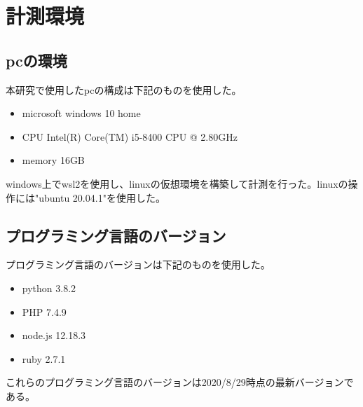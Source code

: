 \chapter{計測環境}
\label{cha:environment}
\section{pcの環境}
本研究で使用したpcの構成は下記のものを使用した。
\begin{itemize}
  \item microsoft windows 10 home
  \item CPU Intel(R) Core(TM) i5-8400 CPU @ 2.80GHz
  \item memory 16GB
\end{itemize}

windows上でwsl2を使用し、linuxの仮想環境を構築して計測を行った。linuxの操作には"ubuntu 20.04.1"を使用した。

\section{プログラミング言語のバージョン}
プログラミング言語のバージョンは下記のものを使用した。
\begin{itemize}
  \item python 3.8.2
  \item PHP 7.4.9
　\item node.js 12.18.3
  \item ruby 2.7.1
\end{itemize}
これらのプログラミング言語のバージョンは2020/8/29時点の最新バージョンである。